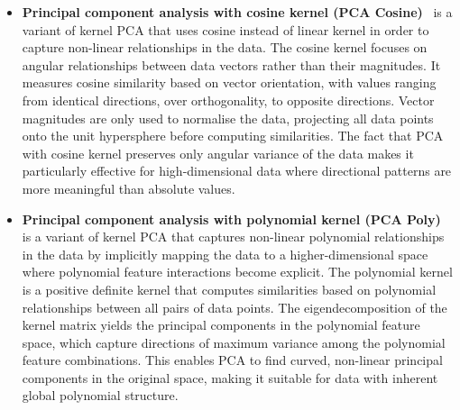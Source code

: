 \begin{itemize}
    \item \textbf{Principal component analysis with cosine kernel (PCA Cosine)}~\citep{SchEtAl97} is a variant of kernel PCA that uses cosine instead of linear kernel in order to capture non-linear relationships in the data. The cosine kernel focuses on angular relationships between data vectors rather than their magnitudes. It measures cosine similarity based on vector orientation, with values ranging from identical directions, over orthogonality, to opposite directions. Vector magnitudes are only used to normalise the data, projecting all data points onto the unit hypersphere before computing similarities. The fact that PCA with cosine kernel preserves only angular variance of the data makes it particularly effective for high-dimensional data where directional patterns are more meaningful than absolute values. 

    \item \textbf{Principal component analysis with polynomial kernel (PCA Poly)}~\citep{SchEtAl97} is a variant of kernel PCA that captures non-linear polynomial relationships in the data by implicitly mapping the data to a higher-dimensional space where polynomial feature interactions become explicit. The polynomial kernel is a positive definite kernel that computes similarities based on polynomial relationships between all pairs of data points. The eigendecomposition of the kernel matrix yields the principal components in the polynomial feature space, which capture directions of maximum variance among the polynomial feature combinations. This enables PCA to find curved, non-linear principal components in the original space, making it suitable for data with inherent global polynomial structure. 


\end{itemize}
